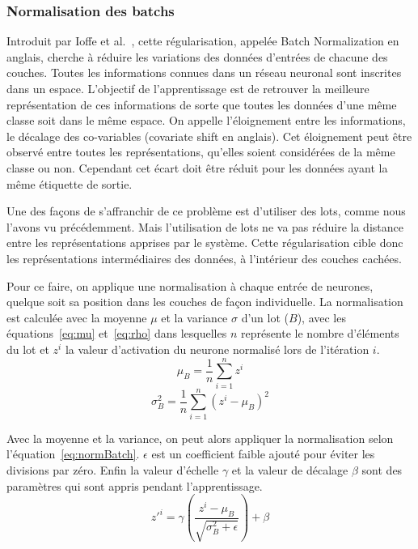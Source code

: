 \subsubsection{Normalisation des batchs}
Introduit par Ioffe et al.~\cite{Ioffe2015}, cette régularisation, appelée Batch Normalization en anglais, cherche à réduire les variations des données d'entrées de chacune des couches. Toutes les informations connues dans un réseau neuronal sont inscrites dans un espace. L'objectif de l'apprentissage est de retrouver la meilleure représentation de ces informations de sorte que toutes les données d'une même classe soit dans le même espace. On appelle l'éloignement entre les informations, le décalage des co-variables (covariate shift en anglais). Cet éloignement peut être observé entre toutes les représentations, qu'elles soient considérées de la même classe ou non. Cependant cet écart doit être réduit pour les données ayant la même étiquette de sortie.

Une des façons de s'affranchir de ce problème est d'utiliser des lots, comme nous l'avons vu précédemment. Mais l'utilisation de lots ne va pas réduire la distance entre les représentations apprises par le système. Cette régularisation cible donc les représentations intermédiaires des données, à l'intérieur des couches cachées.

Pour ce faire, on applique une normalisation à chaque entrée de neurones, quelque soit sa position dans les couches de façon individuelle. La normalisation est calculée avec la moyenne $\mu$ et la variance $\sigma$ d’un lot ($B$), avec les équations~\ref{eq:mu} et~\ref{eq:rho} dans lesquelles $n$ représente le nombre d'éléments du lot et $z^i$ la valeur d'activation du neurone normalisé lors de l'itération $i$.
\begin{equation}
  \mu_B = \frac{1}{n} \sum^n_{i=1}{z^i}
  \label{eq:mu}
\end{equation}
\begin{equation}
  \sigma^2_B = \frac{1}{n} \sum^n_{i=1}{(z^i-\mu_B)^2}
  \label{eq:rho}
\end{equation}

Avec la moyenne et la variance, on peut alors appliquer la normalisation selon l'équation~\ref{eq:normBatch}. $\epsilon$ est un coefficient faible ajouté pour éviter les divisions par zéro. Enfin la valeur d'échelle $\gamma$ et la valeur de décalage $\beta$ sont des paramètres qui sont appris pendant l'apprentissage.
\begin{equation}
  z'^i = \gamma \left ( \frac{z^i-\mu_B}{\sqrt{\sigma^2_B + \epsilon}} \right ) + \beta
  \label{eq:normBatch}
\end{equation}

